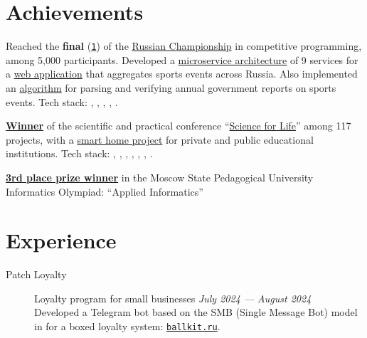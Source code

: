 \documentclass[margin,line]{resume}
\begin{document}
\begin{resume}
  \section{\mysidestyle Achievements}
  Reached the \textbf{final}
  (\href{https://alchemmist.github.io/CV/attachments/russian-chemp-final.pdf}{\texttt{1}})
  of the \href{https://events.fsp-russia.com/championship}{Russian
  Championship} in competitive programming, among 5,000 participants.
  Developed a
  \href{https://alchemmist.github.io/CV/attachments/architect.pdf}{microservice
  architecture} of 9 services for a
  \href{https://github.com/alchemmist/sportprog}{web application}
  that aggregates sports events across Russia. Also implemented an
  \href{https://github.com/alchemmist/sport-afisha/blob/main/event_parsing_service/parse_pdf.py}{algorithm}
  for parsing and verifying annual government reports on sports events.
  Tech stack: , ,
  ,
  ,
  .

  \textbf{\href{https://alchemmist.github.io/CV/attachments/scince-for-life-win.pdf}{Winner}}
  of the scientific and practical conference
  “\href{https://conf.profil.mos.ru/academ}{Science for Life}” among
  117 projects, with a
  \href{https://github.com/smart-cab/}{smart home project} for
  private and public educational institutions.
  Tech stack: ,
  , , ,
  , , .

  \textbf{\href{https://alchemmist.github.io/CV/attachments/informatics-olimpic.pdf}{3rd
  place prize winner}} in the Moscow State Pedagogical University
  Informatics Olympiad: “Applied Informatics”

  \vspace{-2mm}
  \section{\mysidestyle Experience}\vspace{2mm}

  \begin{description}

    \item[Patch Loyalty] Loyalty program for small businesses \hfill
      \textsl{July 2024 — August 2024\vspace{1mm}}\\
      Developed a Telegram bot based on the SMB (Single Message Bot)
      model in  for a boxed loyalty system:
      \href{https://ballkit.ru}{\texttt{ballkit.ru}}.


\end{description}
\end{resume}
\end{document}

